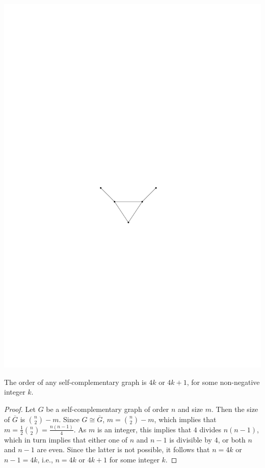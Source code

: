 \begin{center}
\includegraphics{BullGraph.pdf}
\end{center}

\begin{Theorem}\label{thm:SCOrder}
The order of any self-complementary graph is $4k$ or $4k + 1$, for some non-negative integer $k$.
\end{Theorem}

\begin{proof}
Let $G$ be a self-complementary graph of order $n$ and size $m$. Then the size of $\overline G$ is $\binom n 2 - m$. Since $G \cong \overline G$, $m = \binom n 2 - m$, which implies that $m = \frac 1 2 \binom n 2 = \frac {n(n - 1)}{4}$. As $m$ is an integer, this implies that $4$ divides $n(n - 1)$, which in turn implies that either one of $n$ and $n - 1$ is divisible by $4$, or both $n$ and $n - 1$ are even. Since the latter is not possible, it follows that $n = 4k$ or $n - 1 = 4k$, i.e., $n = 4k$ or $4k + 1$ for some integer $k$.
\end{proof}


